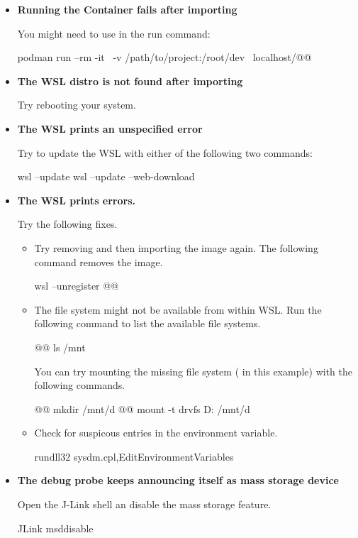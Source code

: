 \begin{itemize}
  \item {\bf Running the Container fails after importing}

    You might need to use  in the run command:
  \begin{monobox}
podman run --rm -it \
  -v /path/to/project:/root/dev \
  localhost/@\imagename{}@
\end{monobox}
  \item {\bf The WSL distro is not found after importing}

    Try rebooting your system.
  \item {\bf The WSL prints an unspecified error}

    Try to update the WSL with either of the following two commands:
  \begin{monobox}
wsl --update
wsl --update --web-download
\end{monobox}
  \item {\bf The WSL prints  errors.}

    Try the following fixes.
    \begin{itemize}
      \item Try removing and then importing the image again.
        The following command removes the image.
        \begin{monobox}
wsl --unregister @\imagename{}@
\end{monobox}
      \item The file system might not be available from within WSL.
        Run the following command to list the available file systems.
        \begin{monobox}
@\cmdinwsl{}@ ls /mnt
\end{monobox}
        You can try mounting the missing file system ( in this example) with the following commands.
        \begin{monobox}
@\cmdinwsl{}@ mkdir /mnt/d
@\cmdinwsl{}@ mount -t drvfs D: /mnt/d
\end{monobox}
      \item Check for suspicous entries in the \mono{Path} environment variable.
        \begin{monobox}
rundll32 sysdm.cpl,EditEnvironmentVariables
\end{monobox}
    \end{itemize}
  \item {\bf The debug probe keeps announcing itself as mass storage device}

    Open the J-Link shell an disable the mass storage feature.
  \begin{monobox}
JLink
msddisable
\end{monobox}
\end{itemize}
